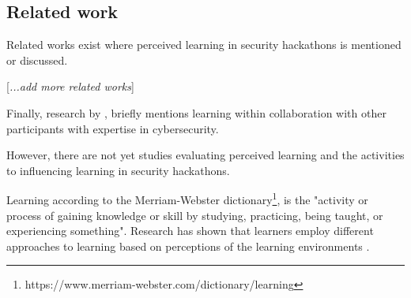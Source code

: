 \subsection{Related work}

Related works exist where perceived learning in security hackathons is mentioned or discussed. 

[\textit{...add more related works}]

Finally, research by \cite{foley2018science}, briefly mentions learning within collaboration with other participants with expertise in cybersecurity. 

However, there are not yet studies evaluating perceived learning and the activities to influencing learning in security hackathons.


Learning according to the Merriam-Webster dictionary\footnote{https://www.merriam-webster.com/dictionary/learning}, is the "activity or process of gaining knowledge or skill by studying, practicing, being taught, or experiencing something". Research has shown that learners employ different approaches to learning based on perceptions of the learning environments \cite{entwistle1991approaches,marton1997approaches}. %

